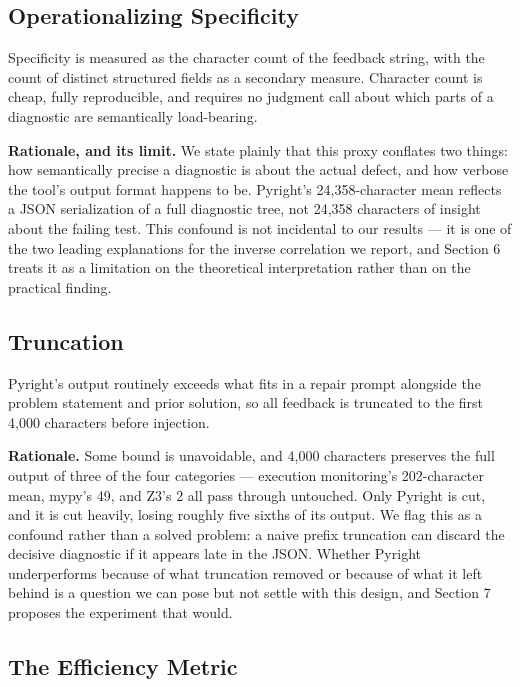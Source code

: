 \subsection{Operationalizing Specificity}

Specificity is measured as the character count of the feedback string, with the count of distinct structured fields as a secondary measure. Character count is cheap, fully reproducible, and requires no judgment call about which parts of a diagnostic are semantically load-bearing.

\textbf{Rationale, and its limit.} We state plainly that this proxy conflates two things: how semantically precise a diagnostic is about the actual defect, and how verbose the tool's output format happens to be. Pyright's 24,358-character mean reflects a JSON serialization of a full diagnostic tree, not 24,358 characters of insight about the failing test. This confound is not incidental to our results --- it is one of the two leading explanations for the inverse correlation we report, and Section 6 treats it as a limitation on the theoretical interpretation rather than on the practical finding.

\subsection{Truncation}

Pyright's output routinely exceeds what fits in a repair prompt alongside the problem statement and prior solution, so all feedback is truncated to the first 4,000 characters before injection.

\textbf{Rationale.} Some bound is unavoidable, and 4,000 characters preserves the full output of three of the four categories --- execution monitoring's 202-character mean, mypy's 49, and Z3's 2 all pass through untouched. Only Pyright is cut, and it is cut heavily, losing roughly five sixths of its output. We flag this as a confound rather than a solved problem: a naive prefix truncation can discard the decisive diagnostic if it appears late in the JSON. Whether Pyright underperforms because of what truncation removed or because of what it left behind is a question we can pose but not settle with this design, and Section 7 proposes the experiment that would.

\subsection{The Efficiency Metric}

